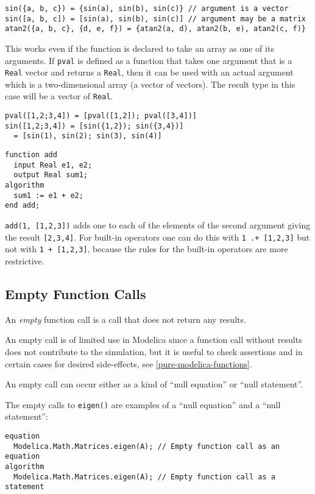 \begin{example}
\begin{lstlisting}[language=modelica]
sin({a, b, c}) = {sin(a), sin(b), sin(c)} // argument is a vector
sin([a, b, c]) = [sin(a), sin(b), sin(c)] // argument may be a matrix
atan2({a, b, c}, {d, e, f}) = {atan2(a, d), atan2(b, e), atan2(c, f)}
\end{lstlisting}
This works even if the function is declared to take an array as one of its arguments.
If \lstinline!pval! is defined as a function that takes one argument that is a \lstinline!Real! vector and returns a \lstinline!Real!, then it can be used with an actual argument which is a two-dimensional array (a vector of vectors).
The result type in this case will be a vector of \lstinline!Real!.
\begin{lstlisting}[language=modelica]
pval([1,2;3,4]) = [pval([1,2]); pval([3,4])]
sin([1,2;3,4]) = [sin({1,2}); sin({3,4})]
  = [sin(1), sin(2); sin(3), sin(4)]
\end{lstlisting}
\begin{lstlisting}[language=modelica]
function add
  input Real e1, e2;
  output Real sum1;
algorithm
  sum1 := e1 + e2;
end add;
\end{lstlisting}
\lstinline!add(1, [1,2,3])! adds one to each of the elements of the second argument giving the result \lstinline![2,3,4]!.
For built-in operators one can do this with \lstinline!1 .+ [1,2,3]! but not with \lstinline!1 + [1,2,3]!, because the rules for the built-in operators are more restrictive.
\end{example}

\subsection{Empty Function Calls}\label{empty-function-calls}

An \emph{empty} function call is a call that does not return any results.

\begin{nonnormative}
An empty call is of limited use in Modelica since a function call without results does not contribute to the simulation,
but it is useful to check assertions and in certain cases for desired side-effects, see \cref{pure-modelica-functions}.
\end{nonnormative}

An empty call can occur either as a kind of ``null equation'' or ``null statement''.

\begin{example}
The empty calls to \lstinline!eigen()! are examples of a ``null equation'' and a ``null statement'':
\begin{lstlisting}[language=modelica]
equation
  Modelica.Math.Matrices.eigen(A); // Empty function call as an equation
algorithm
  Modelica.Math.Matrices.eigen(A); // Empty function call as a statement
\end{lstlisting}
\end{example}

